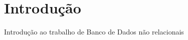 \chapter{Introdução}

Introdução ao trabalho de Banco de Dados não relacionais\cite{carpenter91}








